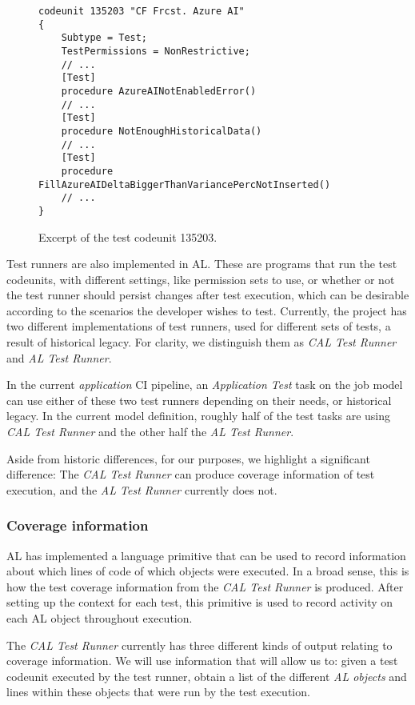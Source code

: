 \begin{figure}
    \begin{Verbatim}[fontsize=\tiny]
codeunit 135203 "CF Frcst. Azure AI"
{
    Subtype = Test;
    TestPermissions = NonRestrictive;
    // ...
    [Test]
    procedure AzureAINotEnabledError()
    // ...
    [Test]
    procedure NotEnoughHistoricalData()
    // ...
    [Test]
    procedure FillAzureAIDeltaBiggerThanVariancePercNotInserted()
    // ...
}
    \end{Verbatim}
    \caption{Excerpt of the test codeunit 135203.}
    \label{fig:bg-bc-test-codeunit}
\end{figure}

Test runners are also implemented in AL. These are programs that run the test codeunits, with different
settings, like permission sets to use, or whether or not the test runner should persist changes after 
test execution, which can be desirable according to the scenarios the developer wishes to test. Currently, 
the project has two different implementations of test runners, used for different
sets of tests, a result of historical legacy. For clarity, we distinguish them
as \emph{CAL Test Runner} and \emph{AL Test Runner}.

In the current \emph{application} CI pipeline, an \emph{Application Test} task on the job model can use either of these 
two test runners depending on their needs, or historical legacy. In the current model definition,
roughly half of the test tasks are using \emph{CAL Test Runner} and the other half the \emph{AL Test Runner}.

Aside from historic differences, for our purposes, we highlight a significant
difference: The \emph{CAL Test Runner} can produce coverage information of test execution, and the \emph{AL Test Runner}
currently does not.

\subsubsection{Coverage information}\label{s:bg-bc-coverage}
AL has implemented a language primitive that can be used to record information about which lines 
of code of which objects were executed. In a broad sense, this is how the test coverage information from 
the \emph{CAL Test Runner} is produced. After setting up the context for each test, this primitive is used
to record activity on each AL object throughout execution.

The \emph{CAL Test Runner} currently has three different kinds of output relating to coverage information.
We will use information that will allow us to: given a test codeunit executed by the test runner, 
obtain a list of the different \emph{AL objects} and lines within these objects that were run by
the test execution.

